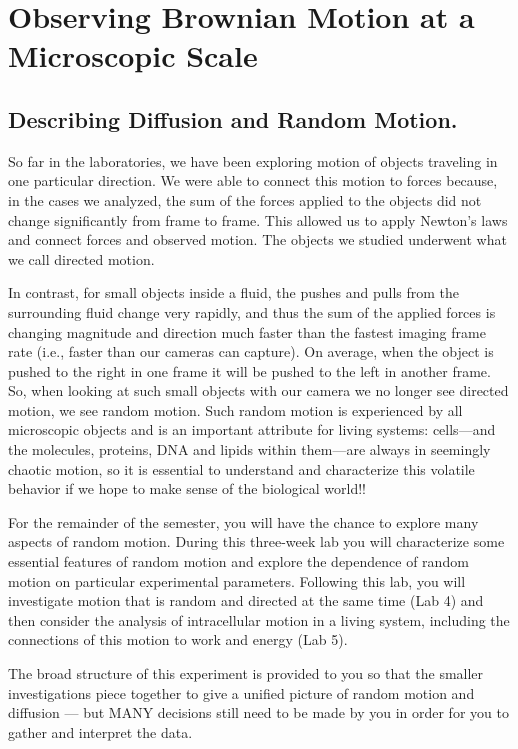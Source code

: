 \chapter{Observing Brownian Motion at a Microscopic Scale}
\thispagestyle{fancy}
%
\section{Describing Diffusion and Random Motion.}
So far in the laboratories, we have been exploring motion of objects traveling in one particular direction.
We were able to connect this motion to forces because, in the cases we analyzed, the sum of the forces applied to the objects did not change significantly from frame to frame.
This allowed us to apply Newton’s laws and connect forces and observed motion.
The objects we studied underwent what we call directed motion.
\par
In contrast, for small objects inside a fluid, the pushes and pulls from the surrounding fluid change very rapidly, and thus the sum of the applied forces is changing magnitude and direction much faster than the fastest imaging frame rate (i.e., faster than our cameras can capture).
On average, when the object is pushed to the right in one frame it will be pushed to the left in another frame.
So, when looking at such small objects with our camera we no longer see directed motion, we see random motion.
Such random motion is experienced by all microscopic objects and is an important attribute for living systems: cells—and the molecules, proteins, DNA and lipids within them—are always in seemingly chaotic motion, so it is essential to understand and characterize this volatile behavior if we hope to make sense of the biological world!!
\par
For the remainder of the semester, you will have the chance to explore many aspects of random motion.
During this three-week lab you will characterize some essential features of random motion and explore the dependence of random motion on particular experimental parameters.
Following this lab, you will investigate motion that is random and directed at the same time (Lab 4) and then consider the analysis of intracellular motion in a living system, including the connections of this motion to work and energy (Lab 5).
\par 
The broad structure of this experiment is provided to you so that the smaller investigations piece together to give a unified picture of random motion and diffusion — but MANY decisions still need to be made by you in order for you to gather and interpret the data.
